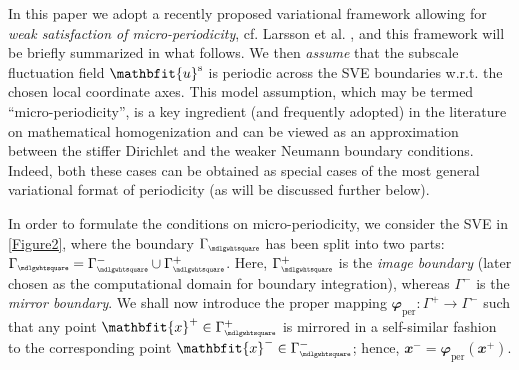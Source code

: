 \documentclass[12pt,a4paper]{article}
\renewcommand{\ta}[1]{\mathbfit{#1}}
\renewcommand{\Box}{\mdlgwhtsquare}
\newcommand{\per}{\mathrm{per}}
\newcommand{\rve}{
  {\mathchoice
   {\mbox{\scalebox{0.67}{$\Box$}}}
   {\mbox{\scalebox{0.67}{$\Box$}}}
   {\mbox{\scalebox{0.5}{$\Box$}}}
   {\mbox{\scalebox{0.375}{$\Box$}}}
  }
}
\begin{document}
In this paper we adopt a recently proposed variational framework allowing for \emph{weak satisfaction of micro-periodicity}, cf. Larsson et al. \cite{Larsson2010}, and this framework will be briefly summarized in what follows.
We then \emph{assume} that the subscale fluctuation field $\ta{u}^\fluct$ is periodic across the SVE boundaries w.r.t. the chosen local coordinate axes.
This model assumption, which may be termed ``micro-periodicity'', is a key ingredient (and frequently adopted) in the literature on mathematical homogenization and can be viewed as an approximation between the stiffer Dirichlet and the weaker Neumann boundary conditions.
Indeed, both these cases can be obtained as special cases of the most general variational format of periodicity (as will be discussed further below).

In order to formulate the conditions on micro-periodicity, we consider the SVE in \cref{Figure2}, where the boundary $\Gamma_\rve$ has been split into two parts: $\Gamma_\rve=\Gamma_\rve^- \cup \Gamma_\rve^+$.
Here, $\Gamma_\rve^+$ is the \emph{image boundary} (later chosen as the computational domain for boundary integration), whereas $\Gamma^-$ is the \emph{mirror boundary}.
We shall now introduce the proper mapping $\ta{\varphi}_\per:\Gamma^+ \rightarrow \Gamma^-$ such that any point $\ta{x}^+\in\Gamma_\rve^+$ is mirrored in a self-similar fashion to the corresponding point $\ta{x}^-\in\Gamma_\rve^-$; hence, $\ta{x}^-=\ta{\varphi}_\per(\ta{x}^+)$.
\end{document}
